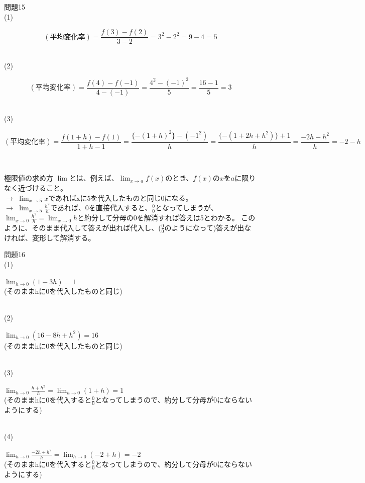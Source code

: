 \documentclass{jsarticle}
\newenvironment{indentblock}{\begin{adjustwidth}{\parindent}{}\hspace{-\parindent}}{\end{adjustwidth}}
\begin{document}
問題15\\
(1)
\begin{indentblock}
\[(平均変化率)=\frac{f(3)-f(2)}{3-2}=3^2-2^2=9-4=5\]
\end{indentblock}
\dotfill\\
(2)
\begin{indentblock}
\[(平均変化率)=\frac{f(4)-f(-1)}{4-(-1)}=\frac{4^2-(-1)^2}{5}=\frac{16-1}{5}=3\]
\end{indentblock}
\dotfill\\
(3)
\begin{indentblock}
\[(平均変化率)=\frac{f(1+h)-f(1)}{1+h-1}=\frac{\{-(1+h)^2\}-(-1^2)}{h}=\frac{\{-(1+2h+h^2)\}+1}{h}=\frac{-2h-h^2}{h}=-2-h\]
\end{indentblock}
\hrulefill\\
\begin{itembox}[l]{極限値の求め方}
$\lim$とは、例えば、$\displaystyle \lim_{x \to a} f(x)$のとき、$f(x)$の$x$を$a$に限りなく近づけること。\\
$\rightarrow$ $\displaystyle \lim_{x \to 5} x$であればxに5を代入したものと同じ0になる。\\
$\rightarrow$ $\displaystyle \lim_{x \to 5} \frac{h^2}{h}$であれば、0を直接代入すると、$\frac{0}{0}$となってしまうが、$\displaystyle \lim_{x \to 0} \frac{h^2}{h}=\lim_{x \to 0} h$と約分して分母の0を解消すれば答えは5とわかる。
このように、そのまま代入して答えが出れば代入し、($\frac{0}{0}$のようになって)答えが出なければ、変形して解消する。
\end{itembox}
問題16\\
(1)
\begin{indentblock}
$\displaystyle \lim_{h \to 0}(1-3h)=1$\\
(そのままhに0を代入したものと同じ)
\end{indentblock}
\dotfill\\
(2)
\begin{indentblock}
$\displaystyle \lim_{h \to 0}(16-8h+h^2)=16$\\
(そのままhに0を代入したものと同じ)
\end{indentblock}
\dotfill\\
(3)
\begin{indentblock}
$\displaystyle \lim_{h \to 0}\frac{h+h^2}{h}=\lim_{h \to 0}(1+h)=1$\\
(そのままhに0を代入すると$\frac{0}{0}$となってしまうので、約分して分母が0にならないようにする)
\end{indentblock}
\dotfill\\
(4)
\begin{indentblock}
$\displaystyle \lim_{h \to 0}\frac{-2h+h^2}{h}=\lim_{h \to 0}(-2+h)=-2$\\
(そのままhに0を代入すると$\frac{0}{0}$となってしまうので、約分して分母が0にならないようにする)
\end{indentblock}
\end{document}
